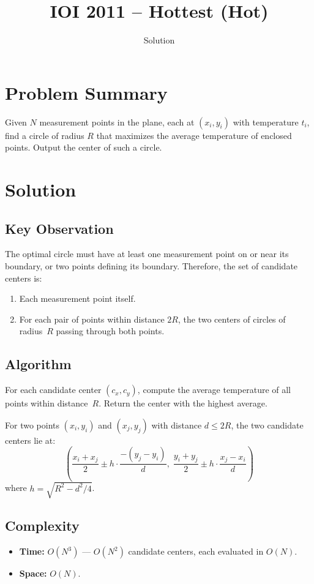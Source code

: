 \documentclass[11pt,a4paper]{article}
\title{IOI 2011 -- Hottest (Hot)}
\author{Solution}
\date{}
\begin{document}
\maketitle

\section{Problem Summary}
Given $N$ measurement points in the plane, each at $(x_i, y_i)$ with temperature $t_i$, find a circle of radius $R$ that maximizes the average temperature of enclosed points. Output the center of such a circle.

\section{Solution}

\subsection{Key Observation}
The optimal circle must have at least one measurement point on or near its boundary, or two points defining its boundary. Therefore, the set of candidate centers is:
\begin{enumerate}
    \item Each measurement point itself.
    \item For each pair of points within distance $2R$, the two centers of circles of radius~$R$ passing through both points.
\end{enumerate}

\subsection{Algorithm}
For each candidate center $(c_x, c_y)$, compute the average temperature of all points within distance~$R$. Return the center with the highest average.

For two points $(x_i, y_i)$ and $(x_j, y_j)$ with distance $d \le 2R$, the two candidate centers lie at:
\[
\left(\frac{x_i + x_j}{2} \pm h \cdot \frac{-(y_j - y_i)}{d},\;
      \frac{y_i + y_j}{2} \pm h \cdot \frac{x_j - x_i}{d}\right)
\]
where $h = \sqrt{R^2 - d^2/4}$.

\subsection{Complexity}
\begin{itemize}
    \item \textbf{Time:} $O(N^3)$ --- $O(N^2)$ candidate centers, each evaluated in $O(N)$.
    \item \textbf{Space:} $O(N)$.
\end{itemize}
\end{document}
